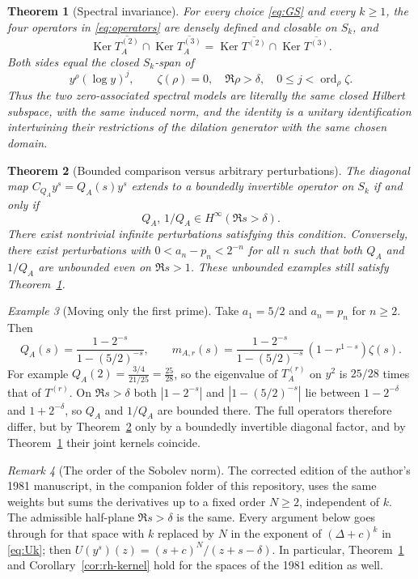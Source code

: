 \documentclass[12pt,letterpaper]{article}
\newtheorem{theorem}{Theorem}[section]
\theoremstyle{remark}
\newtheorem{remark}[theorem]{Remark}
\newtheorem{example}[theorem]{Example}
\numberwithin{equation}{section}
\newcommand{\Ker}{\operatorname{Ker}}
\begin{document}
\begin{theorem}[Spectral invariance]\label{thm:main}
For every choice \eqref{eq:GS} and every $k\ge1$, the four operators in \eqref{eq:operators} are densely defined and closable on $S_k$, and
\begin{equation}\label{eq:main}
 \boxed{\Ker\overline{T_A^{(2)}}\cap\Ker\overline{T_A^{(3)}}
 =\Ker\overline{T^{(2)}}\cap\Ker\overline{T^{(3)}}.}
\end{equation}
Both sides equal the closed $S_k$-span of
\[
 y^\rho(\log y)^j,\qquad
 \zeta(\rho)=0,\quad \Re\rho>\delta,\quad 0\le j<\operatorname{ord}_\rho\zeta.
\]
Thus the two zero-associated spectral models are literally the same closed Hilbert subspace, with the same induced norm, and the identity is a unitary identification intertwining their restrictions of the dilation generator with the same chosen domain.
\end{theorem}

\begin{theorem}[Bounded comparison versus arbitrary perturbations]\label{thm:compare}
The diagonal map $C_{Q_A}y^s=Q_A(s)y^s$ extends to a boundedly invertible operator on $S_k$ if and only if
\[
 Q_A,\,1/Q_A\in H^\infty(\Re s>\delta).
\]
There exist nontrivial \emph{infinite} perturbations satisfying this condition. Conversely, there exist perturbations with $0<a_n-p_n<2^{-n}$ for all $n$ such that \emph{both} $Q_A$ and $1/Q_A$ are unbounded even on $\Re s>1$. These unbounded examples still satisfy Theorem~\ref{thm:main}.
\end{theorem}

\begin{example}[Moving only the first prime]\label{ex:first-prime}
Take $a_1=5/2$ and $a_n=p_n$ for $n\ge2$.  Then
\[
 Q_A(s)=\frac{1-2^{-s}}{1-(5/2)^{-s}},\qquad
 m_{A,r}(s)=\frac{1-2^{-s}}{1-(5/2)^{-s}}\,(1-r^{1-s})\zeta(s).
\]
For example $Q_A(2)=\tfrac{3/4}{21/25}=\tfrac{25}{28}$, so the
eigenvalue of $T_A^{(r)}$ on $y^2$ is $25/28$ times that of $T^{(r)}$.
On $\Re s>\delta$ both $|1-2^{-s}|$ and $|1-(5/2)^{-s}|$ lie between
$1-2^{-\delta}$ and $1+2^{-\delta}$, so $Q_A$ and $1/Q_A$ are bounded
there.  The full operators therefore differ, but by
Theorem~\ref{thm:compare} only by a boundedly invertible diagonal
factor, and by Theorem~\ref{thm:main} their joint kernels coincide.
\end{example}

\begin{remark}[The order of the Sobolev norm]\label{rem:order}
The corrected edition of the author's 1981 manuscript, in the
companion folder of this repository, uses the same weights but sums the derivatives up to a fixed order $N\ge2$,
independent of $k$.  The admissible half-plane $\Re s>\delta$ is the
same.  Every argument below goes through for that space with $k$
replaced by $N$ in the exponent of $(\Delta+c)^k$ in \eqref{eq:Uk};
then $U(y^s)(z)=(s+c)^N/(z+s-\delta)$.  In particular,
Theorem~\ref{thm:main} and Corollary~\ref{cor:rh-kernel} hold for
the spaces of the 1981 edition as well.
\end{remark}
\end{document}
